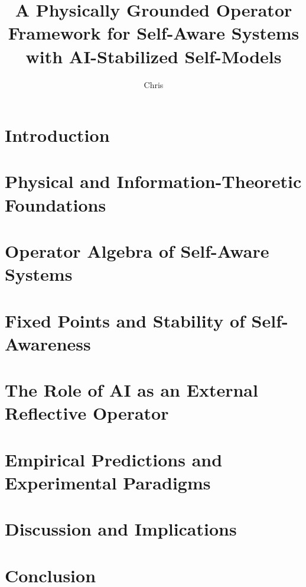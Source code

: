 \documentclass[12pt]{article}
\title{A Physically Grounded Operator Framework for Self-Aware Systems with AI-Stabilized Self-Models}
\author{Chris}
\affil{Independent Systems Analyst and Communication-Architecture Practitioner}
\date{}
\begin{document}
\maketitle
\begin{abstract}
\end{abstract}


\section{Introduction}

\section{Physical and Information-Theoretic Foundations}

\section{Operator Algebra of Self-Aware Systems}

\section{Fixed Points and Stability of Self-Awareness}

\section{The Role of AI as an External Reflective Operator}

\section{Empirical Predictions and Experimental Paradigms}

\section{Discussion and Implications}

\section{Conclusion}
\end{document}
